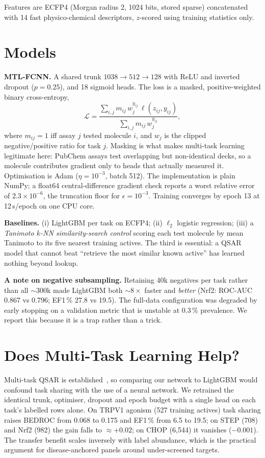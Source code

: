 \documentclass[conference]{IEEEtran}
\begin{document}
Features are ECFP4 (Morgan radius 2, 1024 bits, stored sparse) concatenated with
14 fast physico-chemical descriptors, $z$-scored using training statistics only.

\section{Models}

\textbf{MTL-FCNN.} A shared trunk $1038 \to 512 \to 128$ with ReLU and inverted
dropout ($p{=}0.25$), and 18 sigmoid heads. The loss is a masked, positive-weighted
binary cross-entropy,
\begin{equation}
\mathcal{L} = \frac{\sum_{i,j} m_{ij}\,w_j^{y_{ij}}\,\ell(z_{ij},y_{ij})}
                   {\sum_{i,j} m_{ij}\,w_j^{y_{ij}}},
\end{equation}
where $m_{ij}=1$ iff assay $j$ tested molecule $i$, and $w_j$ is the clipped
negative/positive ratio for task $j$. Masking is what makes multi-task learning
legitimate here: PubChem assays test overlapping but non-identical decks, so a
molecule contributes gradient only to heads that actually measured it.
Optimisation is Adam ($\eta{=}10^{-3}$, batch 512). The implementation is plain
NumPy; a float64 central-difference gradient check reports a worst relative
error of $2.3\times10^{-6}$, the truncation floor for $\epsilon{=}10^{-3}$.
Training converges by epoch 13 at 12\,s/epoch on one CPU core.

\textbf{Baselines.} (i) LightGBM per task on ECFP4; (ii) $\ell_2$ logistic
regression; (iii) a \emph{Tanimoto $k$-NN similarity-search control} scoring each
test molecule by mean Tanimoto to its five nearest training actives. The third
is essential: a QSAR model that cannot beat ``retrieve the most similar known
active'' has learned nothing beyond lookup.

\textbf{A note on negative subsampling.} Retaining 40k negatives per task rather
than all ${\sim}300$k made LightGBM both ${\sim}8\times$ faster and
\emph{better} (Nrf2: ROC-AUC 0.867 vs 0.796; EF1\,\% 27.8 vs 19.5). The
full-data configuration was degraded by early stopping on a validation metric
that is unstable at 0.3\,\% prevalence. We report this because it is a trap
rather than a trick.

\section{Does Multi-Task Learning Help?}
Multi-task QSAR is established~\cite{dahl,kinome}, so comparing our network to
LightGBM would confound task sharing with the use of a neural network. We retrained
the identical trunk, optimiser, dropout and epoch budget with a single head on each
task's labelled rows alone. On TRPV1 agonism (527 training actives) task sharing
raises BEDROC from 0.068 to 0.175 and EF1\,\% from 6.5 to 19.5; on STEP (708) and
Nrf2 (982) the gain falls to ${\approx}{+}0.02$; on CHOP (6{,}544) it vanishes
($-0.001$). The transfer benefit scales inversely with label abundance, which is
the practical argument for disease-anchored panels around under-screened targets.
\end{document}
